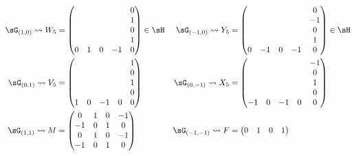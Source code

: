 \begin{equation}		\label{EqGeueuleVWXY}
	\begin{aligned}[]
		\sG_{(1,0)}\leadsto W_5   &
		=\begin{pmatrix}
			   &   &   &    & 0 \\
			   &   &   &    & 1 \\
			   &   &   &    & 0 \\
			   &   &   &    & 1 \\
			 0 & 1 & 0 & -1 & 0
		 \end{pmatrix}\in\sH
		                          & \sG_{(-1,0)}\leadsto Y_5 &
		=\begin{pmatrix}
			   &    &   &    & 0  \\
			   &    &   &    & -1 \\
			   &    &   &    & 0  \\
			   &    &   &    & 1  \\
			 0 & -1 & 0 & -1 & 0
		 \end{pmatrix}\in\sH                                    \\
		\sG_{(0,1)}\leadsto V_{5} & =
		\begin{pmatrix}
			  &   &    &   & 1 \\
			  &   &    &   & 0 \\
			  &   &    &   & 1 \\
			  &   &    &   & 0 \\
			1 & 0 & -1 & 0 & 0
		\end{pmatrix}
		                          & \sG_{(0,-1)}\leadsto X_5 & =
		\begin{pmatrix}
			   &   &    &   & -1 \\
			   &   &    &   & 0  \\
			   &   &    &   & 1  \\
			   &   &    &   & 0  \\
			-1 & 0 & -1 & 0 & 0
		\end{pmatrix}                                     \\
		\sG_{(1,1)}\leadsto M     & =
		\begin{pmatrix}
			0  & 1 & 0 & -1 \\
			-1 & 0 & 1 & 0  \\
			0  & 1 & 0 & -1 \\
			-1 & 0 & 1 & 0
		\end{pmatrix}
		                          & \sG_{(-1,-1)}\leadsto F  & =
		\begin{pmatrix}
			0  & 1  & 0  & 1  \\

\end{pmatrix}
\end{aligned}
\end{equation}
